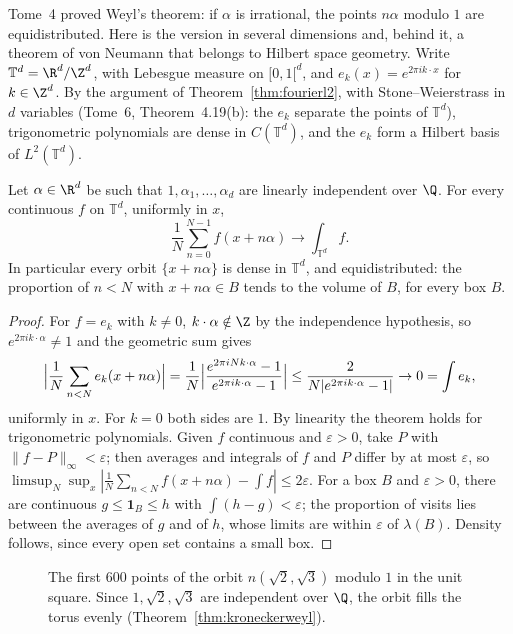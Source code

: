 Tome~4 proved Weyl's theorem: if $\alpha$ is irrational, the points $n\alpha$ modulo $1$ are equidistributed. Here is the version in several dimensions and, behind it, a theorem of von Neumann that belongs to Hilbert space
geometry. Write $\mathbb T^d=\R^d/\Z^d$, with Lebesgue measure on $[0,1[^d$, and $e_k(x)=e^{2\pi ik\cdot x}$ for $k\in\Z^d$. By the argument of Theorem~\ref{thm:fourierl2}, with Stone--Weierstrass in $d$ variables (Tome~6,
Theorem~4.19(b): the $e_k$ separate the points of $\mathbb T^d$), trigonometric polynomials are dense in $C(\mathbb T^d)$, and the $e_k$ form a Hilbert basis of $L^2(\mathbb T^d)$.

\begin{theorem}\label{thm:kroneckerweyl}
Let $\alpha\in\R^d$ be such that $1,\alpha_1,\dots,\alpha_d$ are linearly independent over $\Q$. For every continuous $f$ on $\mathbb T^d$, uniformly in $x$,
\[\frac1N\sum_{n=0}^{N-1}f(x+n\alpha)\longrightarrow\int_{\mathbb T^d}f.\]
In particular every orbit $\{x+n\alpha\}$ is dense in $\mathbb T^d$, and equidistributed: the proportion of $n<N$ with $x+n\alpha\in B$ tends to the volume of $B$, for every box $B$.
\end{theorem}
\begin{proof}
For $f=e_k$ with $k\ne0$, $k\cdot\alpha\notin\Z$ by the independence hypothesis, so $e^{2\pi ik\cdot\alpha}\ne1$ and the geometric sum gives
\[\Bigl|\frac1N\sum_{n<N}e_k(x+n\alpha)\Bigr|=\frac1N\Bigl|\frac{e^{2\pi iNk\cdot\alpha}-1}{e^{2\pi ik\cdot\alpha}-1}\Bigr|\le\frac2{N|e^{2\pi ik\cdot\alpha}-1|}\to0=\int e_k,\]
uniformly in $x$. For $k=0$ both sides are $1$. By linearity the theorem holds for trigonometric polynomials. Given $f$ continuous and $\varepsilon>0$, take $P$ with $\|f-P\|_\infty<\varepsilon$; then averages and integrals of $f$
and $P$ differ by at most $\varepsilon$, so $\limsup_N\sup_x|\frac1N\sum_{n<N}f(x+n\alpha)-\int f|\le2\varepsilon$. For a box $B$ and $\varepsilon>0$, there are continuous $g\le\mathbf 1_B\le h$ with $\int(h-g)<\varepsilon$; the proportion of
visits lies between the averages of $g$ and of $h$, whose limits are within $\varepsilon$ of $\lambda(B)$. Density follows, since every open set contains a small box.
\end{proof}

\begin{figure}[ht]
\centering
{}
\caption{The first $600$ points of the orbit $n(\sqrt2,\sqrt3)$ modulo $1$ in the unit square. Since $1,\sqrt2,\sqrt3$ are independent over $\Q$, the orbit fills the torus evenly (Theorem~\ref{thm:kroneckerweyl}).}
\label{fig:kronecker}
\end{figure}

